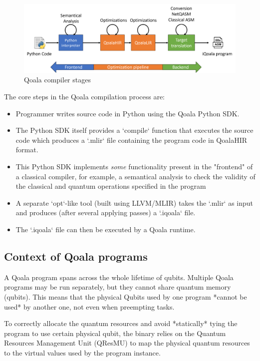 \begin{figure}[ht]
    \centering
    \includegraphics[scale=1.0]{figures/compiler/compiler-arch.png}
    \caption{Qoala compiler stages}
    \label{fig:qoala_compiler_stages}
\end{figure}


The core steps in the Qoala compilation process are:

\begin{itemize}
\item Programmer writes source code in Python using the Qoala Python SDK.
\item The Python SDK itself provides a `compile` function that executes the source code
  which produces a `.mlir` file containing the program code in QoalaHIR format.
\item This Python SDK implements \textit{some} functionality present in the "frontend" of a classical
  compiler, for example, a semantical analysis to check the validity of the classical and
  quantum operations specified in the program 
\item A separate `opt`-like tool (built using LLVM/MLIR) takes the `.mlir` as input and produces
  (after several applying passes) a `.iqoala` file.
\item The `.iqoala` file can then be executed by a Qoala runtime.
\end{itemize}


\subsection{Context of Qoala programs}
A Qoala program spans across the whole lifetime of qubits.
Multiple Qoala programs may be run separately, but they cannot share quantum memory (qubits).
This means that the physical Qubits used by one program *cannot be used* by another one, not
even when preempting tasks.

To correctly allocate the quantum resources and avoid *statically* tying the program to use
certain physical qubit, the binary relies on the Quantum Resources Management Unit (QResMU) to map
the physical quantum resources to the virtual values used by the program instance.


